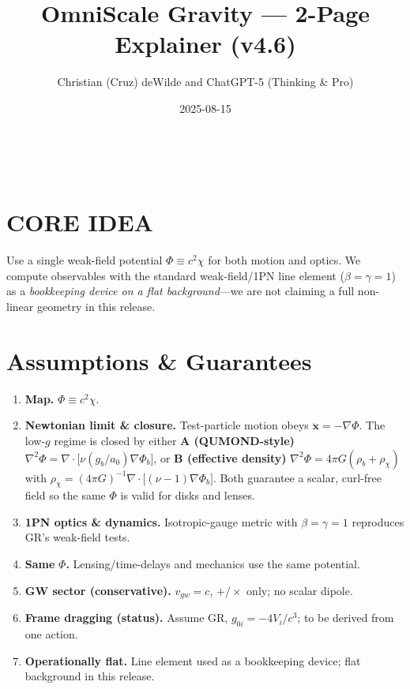 \documentclass[
]{article}
\title{OmniScale Gravity --- 2-Page Explainer (v4.6)}
\author{\protect\phantomsection\label{_Hlk206169066}{}Christian (Cruz)
deWilde and ChatGPT-5 (Thinking \& Pro)}
\date{2025-08-15}
\begin{document}
\maketitle

~

\section{CORE IDEA}\label{core-idea}

Use a single weak-field potential \(\Phi \equiv c^{2}\chi\) for both
motion and optics. We compute observables with the standard
weak-field/1PN line element (\(\beta = \gamma = 1\)) as a
\emph{bookkeeping device on a flat background}---we are not claiming a
full non-linear geometry in this release.

\section{Assumptions \& Guarantees}\label{assumptions-guarantees}

\begin{enumerate}
\def\labelenumi{\arabic{enumi}.}
\item
  \textbf{Map.} \(\Phi \equiv c^{2}\chi\).
\item
  \textbf{Newtonian limit \& closure.} Test-particle motion obeys
  \(\ddot{\mathbf{x}} = - \nabla\Phi\). The low-\(g\) regime is closed
  by either \textbf{A (QUMOND-style)}
  \(\nabla^{2}\Phi = \nabla \cdot \lbrack\nu(g_{b}/a_{0})\nabla\Phi_{b}\rbrack\),
  or \textbf{B (effective density)}
  \(\nabla^{2}\Phi = 4\pi G(\rho_{b} + \rho_{\chi})\) with
  \(\rho_{\chi} = (4\pi G)^{- 1}\nabla \cdot \lbrack(\nu - 1)\nabla\Phi_{b}\rbrack\).
  Both guarantee a scalar, curl-free field so the same \(\Phi\) is valid
  for disks and lenses.
\item
  \textbf{1PN optics \& dynamics.} Isotropic-gauge metric with
  \(\beta = \gamma = 1\) reproduces GR's weak-field tests.
\item
  \textbf{Same} \(\Phi\)\textbf{.} Lensing/time-delays and mechanics use
  the same potential.
\item
  \textbf{GW sector (conservative).} \(v_{gw} = c\), \(+ / \times\)
  only; no scalar dipole.
\item
  \textbf{Frame dragging (status).} Assume GR,
  \(g_{0i} = - 4V_{i}/c^{3}\); to be derived from one action.
\item
  \textbf{Operationally flat.} Line element used as a bookkeeping
  device; flat background in this release.
\end{enumerate}
\end{document}
